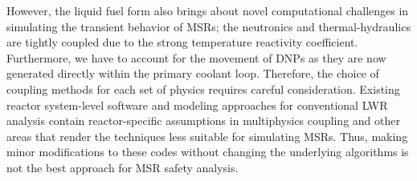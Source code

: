However, the liquid fuel form also brings about novel computational
challenges in simulating the transient behavior of \glspl{MSR}; the
neutronics and thermal-hydraulics are tightly coupled due to the strong
temperature reactivity coefficient. Furthermore, we have to account for the
movement of \glspl{DNP} as
they are now generated directly within the primary coolant loop. Therefore,
the choice of coupling methods for each set of physics requires careful
consideration. Existing reactor system-level software and modeling approaches
for conventional \gls{LWR} analysis contain reactor-specific assumptions in
multiphysics coupling and other areas that render the techniques less suitable
for simulating \glspl{MSR}. Thus, making minor modifications to these codes
without changing the underlying algorithms is not the best approach for
\gls{MSR} safety analysis.

